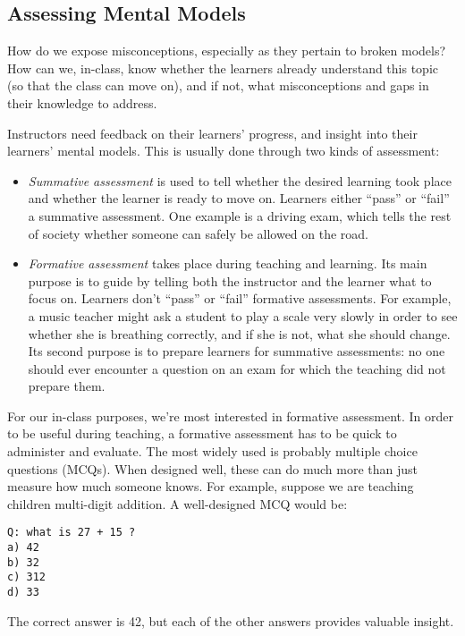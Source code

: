 \subsection*{Assessing Mental Models}

How do we expose misconceptions, especially as they pertain to broken models?  How
can we, in-class, know whether the learners already understand this topic
(so that the class can move on),
and if not,
what misconceptions and gaps in their knowledge to address.

Instructors need feedback on their learners' progress,
and insight into their learners' mental models.
This is usually done through two kinds of assessment:

\begin{itemize}
\item \emph{Summative assessment} is used
to tell whether the desired learning took place
and whether the learner is ready to move on.
Learners either ``pass'' or ``fail'' a summative assessment.
One example is a driving exam,
which tells the rest of society whether someone can safely be allowed on the road.
\item \emph{Formative assessment} takes place during teaching and learning.
Its main purpose is to guide by telling both the instructor and the learner what to focus on.
Learners don't ``pass'' or ``fail'' formative assessments.
For example,
a music teacher might ask a student to play a scale very slowly
in order to see whether she is breathing correctly,
and if she is not,
what she should change.
Its second purpose is to prepare learners for summative assessments:
no one should ever encounter a question on an exam
for which the teaching did not prepare them.
\end{itemize}

For our in-class purposes, we're most interested in formative assessment.
In order to be useful during teaching,
a formative assessment has to be quick to administer and evaluate.
The most widely used is probably multiple choice questions (MCQs).
When designed well,
these can do much more than just measure how much someone knows.
For example,
suppose we are teaching children multi-digit addition.
A well-designed MCQ would be:

\begin{verbatim}Q: what is 27 + 15 ?
a) 42
b) 32
c) 312
d) 33
\end{verbatim}

The correct answer is 42,
but each of the other answers provides valuable insight.

